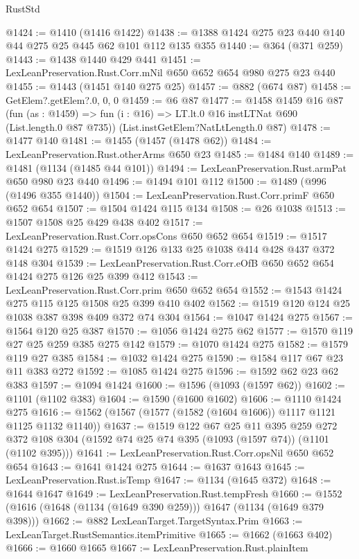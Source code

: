 \begin{lexlean}{RustStd}
\begin{coremodule}
@1424 := @1410 (@1416 @1422)
@1438 := @1388 @1424 @275 @23 @440 @140 @44 @275 @25 @445 @62 @101 @112 @135 @355
@1440 := @364 (@371 @259)
@1443 := @1438 @1440 @429 @441
@1451 := LexLeanPreservation.Rust.Corr.mNil @650 @652 @654 @980 @275 @23 @440
@1455 := @1443 (@1451 @140 @275 @25)
@1457 := @882 (@674 @87)
@1458 := GetElem?.getElem?.{0, 0, 0}
@1459 := @6 @87
@1477 := @1458
    @1459
    @16
    @87
    (fun (as : @1459) => fun (i : @16) => LT.lt.{0} @16 instLTNat @690 (List.length.{0} @87 @735))
    (List.instGetElem?NatLtLength.{0} @87)
@1478 := @1477 @140
@1481 := @1455 (@1457 (@1478 @62))
@1484 := LexLeanPreservation.Rust.otherArms @650 @23
@1485 := @1484 @140
@1489 := @1481 (@1134 (@1485 @44 @101))
@1494 := LexLeanPreservation.Rust.armPat @650 @980 @23 @440
@1496 := @1494 @101 @112
@1500 := @1489 (@996 (@1496 @355 @1440))
@1504 := LexLeanPreservation.Rust.Corr.primF @650 @652 @654
@1507 := @1504 @1424 @115 @134
@1508 := @26 @1038
@1513 := @1507 @1508 @25 @429 @438 @402
@1517 := LexLeanPreservation.Rust.Corr.opsCons @650 @652 @654
@1519 := @1517 @1424 @275
@1529 := @1519 @126 @133 @25 @1038 @414 @428 @437 @372 @148 @304
@1539 := LexLeanPreservation.Rust.Corr.eOfB @650 @652 @654 @1424 @275 @126 @25 @399 @412
@1543 := LexLeanPreservation.Rust.Corr.prim @650 @652 @654
@1552 := @1543 @1424 @275 @115 @125 @1508 @25 @399 @410 @402
@1562 := @1519 @120 @124 @25 @1038 @387 @398 @409 @372 @74 @304
@1564 := @1047 @1424 @275
@1567 := @1564 @120 @25 @387
@1570 := @1056 @1424 @275 @62
@1577 := @1570 @119 @27 @25 @259 @385 @275 @142
@1579 := @1070 @1424 @275
@1582 := @1579 @119 @27 @385
@1584 := @1032 @1424 @275
@1590 := @1584 @117 @67 @23 @11 @383 @272
@1592 := @1085 @1424 @275
@1596 := @1592 @62 @23 @62 @383
@1597 := @1094 @1424
@1600 := @1596 (@1093 (@1597 @62))
@1602 := @1101 (@1102 @383)
@1604 := @1590 (@1600 @1602)
@1606 := @1110 @1424 @275
@1616 := @1562 (@1567 (@1577 (@1582 (@1604 @1606)) @1117 @1121 @1125 @1132 @1140))
@1637 := @1519
    @122
    @67
    @25
    @11
    @395
    @259
    @272
    @372
    @108
    @304
    (@1592 @74 @25 @74 @395 (@1093 (@1597 @74)) (@1101 (@1102 @395)))
@1641 := LexLeanPreservation.Rust.Corr.opsNil @650 @652 @654
@1643 := @1641 @1424 @275
@1644 := @1637 @1643
@1645 := LexLeanPreservation.Rust.isTemp
@1647 := @1134 (@1645 @372)
@1648 := @1644 @1647
@1649 := LexLeanPreservation.Rust.tempFresh
@1660 := @1552 (@1616 (@1648 (@1134 (@1649 @390 @259))) @1647 (@1134 (@1649 @379 @398)))
@1662 := @882 LexLeanTarget.TargetSyntax.Prim
@1663 := LexLeanTarget.RustSemantics.itemPrimitive
@1665 := @1662 (@1663 @402)
@1666 := @1660 @1665
@1667 := LexLeanPreservation.Rust.plainItem

\end{coremodule}
\end{lexlean}
